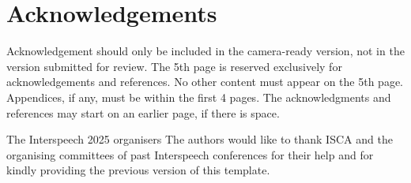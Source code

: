 \documentclass{Interspeech}
\begin{document}
\section{Acknowledgements}
Acknowledgement should only be included in the camera-ready version, not in the version submitted for review. The 5th page is reserved exclusively for acknowledgements and  references. No other content must appear on the 5th page. Appendices, if any, must be within the first 4 pages. The acknowledgments and references may start on an earlier page, if there is space.

\ifinterspeechfinal
     The Interspeech 2025 organisers
\else
     The authors
\fi
would like to thank ISCA and the organising committees of past Interspeech conferences for their help and for kindly providing the previous version of this template.




\end{document}

